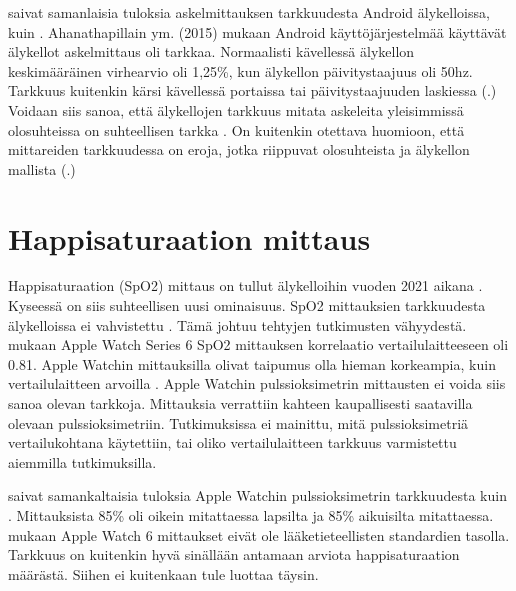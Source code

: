 \documentclass[utf8,bachelor,finnish]{bachelor}
\begin{document}
  \textcite{ahanathapillai_preliminary_2015} saivat samanlaisia tuloksia askelmittauksen tarkkuudesta Android älykelloissa, kuin \textcite{gaz_determining_2018}.
   Ahanathapillain ym. (2015) mukaan Android käyttöjärjestelmää käyttävät älykellot askelmittaus oli tarkkaa.
    Normaalisti kävellessä älykellon keskimääräinen virhearvio oli 1,25\%, kun älykellon päivitystaajuus oli 50hz.
     Tarkkuus kuitenkin kärsi kävellessä portaissa tai päivitystaajuuden laskiessa (\cite{ahanathapillai_preliminary_2015}.)\\
  
  Voidaan siis sanoa, että älykellojen tarkkuus mitata askeleita yleisimmissä olosuhteissa on suhteellisen tarkka
   \parencite{gaz_determining_2018,ahanathapillai_preliminary_2015}. On kuitenkin otettava huomioon, että mittareiden
    tarkkuudessa on eroja, jotka riippuvat olosuhteista ja älykellon mallista (\cite{gaz_determining_2018}.)
  

  \section{Happisaturaation mittaus}
  Happisaturaation (SpO2) mittaus on tullut älykelloihin vuoden 2021 aikana \parencite{zhang_can_2022}. Kyseessä on siis suhteellisen uusi ominaisuus.
   SpO2 mittauksien tarkkuudesta älykelloissa ei vahvistettu \parencite{zhang_can_2022}. Tämä johtuu tehtyjen tutkimusten vähyydestä.\\
    
  \cite{pipek_comparison_2021} mukaan Apple Watch Series 6 SpO2 mittauksen korrelaatio vertailulaitteeseen oli 0.81.
   Apple Watchin mittauksilla olivat taipumus olla hieman korkeampia, kuin vertailulaitteen arvoilla \parencite{pipek_comparison_2021}.
    Apple Watchin pulssioksimetrin mittausten ei voida siis sanoa olevan tarkkoja.
    Mittauksia verrattiin kahteen kaupallisesti saatavilla olevaan pulssioksimetriin.
     Tutkimuksissa ei mainittu, mitä pulssioksimetriä vertailukohtana käytettiin, tai oliko vertailulaitteen tarkkuus varmistettu aiemmilla tutkimuksilla.
   
  \cite{patz_accuracy_2023} saivat samankaltaisia tuloksia Apple Watchin pulssioksimetrin tarkkuudesta kuin \cite{pipek_comparison_2021}. Mittauksista 85\%
   oli oikein mitattaessa lapsilta ja 85\% aikuisilta mitattaessa.\cite{patz_accuracy_2023} mukaan Apple Watch 6 mittaukset eivät ole
    lääketieteellisten standardien tasolla. Tarkkuus on kuitenkin hyvä sinällään antamaan arviota happisaturaation määrästä.
     Siihen ei kuitenkaan tule luottaa täysin.
      
\end{document}
